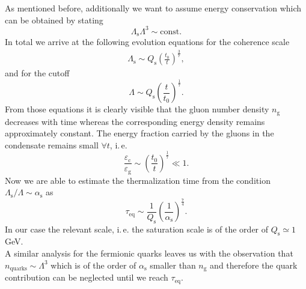 As mentioned before, additionally we want to assume energy conservation which can be obtained by stating
\begin{equation}
	\Lambda_{\mathrm{s}}\Lambda^3 \sim \mathrm{const.}
\end{equation}
In total we arrive at the following evolution equations for the coherence scale	
\begin{align}
	\Lambda_{\mathrm{s}} \sim  Q_{\mathrm{s}}\left(\frac{t_0}{t}\right)^{\frac{3}{7}},
\end{align}
and for the cutoff 
\begin{equation}
		\Lambda \sim  Q_{\mathrm{s}}\left(\frac{t}{t_0}\right)^{\frac{1}{7}}.
\end{equation}
From those equations it is clearly visible that the gluon number density $n_{\mathrm{g}}$ decreases with time whereas the corresponding energy density remains approximately constant. The energy fraction carried by the gluons in the condensate remains small $\forall t$, i.\,e.
\begin{equation}
	\frac{\varepsilon_{\mathrm{c}}}{\varepsilon_{\mathrm{g}}} \sim \left(\frac{t_0}{t}\right)^{\frac{1}{7}} \ll 1.
\end{equation}
Now we are able to estimate the thermalization time from the condition $\Lambda_{\mathrm{s}}/\Lambda\sim\alpha_{\mathrm{s}}$ as
\begin{equation}
	\tau_{\mathrm{eq}} \sim \frac{1}{Q_{\mathrm{s}}}\left(\frac{1}{\alpha_{\mathrm{s}}}\right)^{\frac{7}{4}}.
\end{equation}
In our case the relevant scale, i.\,e. the saturation scale is of the order of $Q_{\mathrm{s}}\simeq 1$ GeV. \\

\noindent 
A similar analysis for the fermionic quarks leaves us with the observation that $n_{\mathrm{quarks}}\sim \Lambda^3$ which is of the order of $\alpha_{\mathrm{s}}$ smaller than $n_{\mathrm{g}}$ and therefore the quark contribution can be neglected until we reach $\tau_{\mathrm{eq}}$.